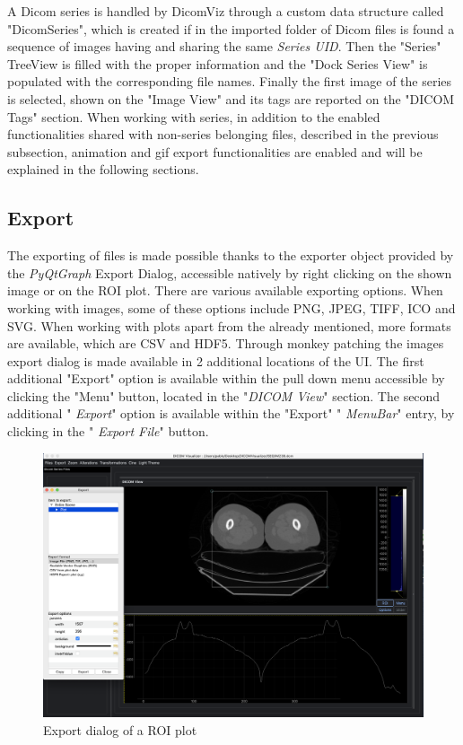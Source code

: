 \documentclass[conference]{IEEEtran}
\begin{document}
A Dicom series is handled by DicomViz through a custom data structure called "DicomSeries", which is created if in the imported folder of Dicom files is found a sequence of images having and sharing the same  \textit{Series UID}. Then the "Series" TreeView is filled with the proper information and the "Dock Series View" is populated with the corresponding file names. Finally the first image of the series is selected, shown on the "Image View" and its tags are reported on the "DICOM Tags" section. When working with series, in addition to the enabled functionalities shared with non-series belonging files, described in the previous subsection, animation and gif export functionalities are enabled and will be explained in the following sections.

\subsection{Export}

The exporting of files is made possible thanks to the exporter object provided by the  \textit{PyQtGraph} Export Dialog, accessible natively by right clicking on the shown image or on the ROI plot. There are various available exporting options.
When working with images, some of these options include PNG, JPEG, TIFF, ICO and SVG.
When working with plots apart from the already mentioned, more formats are available, which are CSV and HDF5.
Through monkey patching the images export dialog is made available in 2 additional locations of the UI.
The first additional "Export" option is available within the pull down menu accessible by clicking the "Menu" button, located in the "\textit{DICOM View}" section.
The second additional " \textit{Export}" option is available within the "Export" " \textit{MenuBar}" entry, by clicking in the " \textit{Export File}" button.

\begin{figure}[h]
  \includegraphics[width=\columnwidth]
    {export.png}\hfill
  \caption{Export dialog of a ROI plot}
\end{figure}
\end{document}
